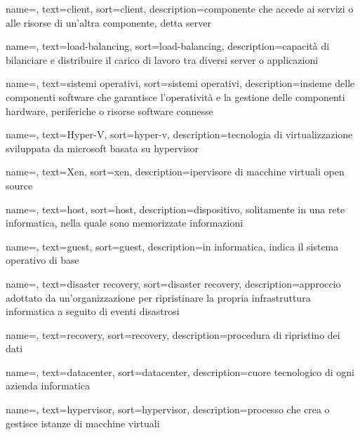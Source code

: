 {
    name=,
    text=client,
    sort=client, 
    description={componente che accede ai servizi o alle risorse di un'altra componente, detta server}
}

{
    name=,
    text=load-balancing,
    sort=load-balancing, 
    description={capacità di bilanciare e distribuire il carico di lavoro tra diversi server o applicazioni}
}

{
    name=,
    text=sistemi operativi,
    sort=sistemi operativi, 
    description={insieme delle componenti software che garantisce l'operatività e la gestione delle componenti hardware, periferiche o risorse software connesse}
}

{
    name=,
    text=Hyper-V,
    sort=hyper-v, 
    description={tecnologia di virtualizzazione sviluppata da microsoft basata su hypervisor}
}

{
    name=,
    text=Xen,
    sort=xen, 
    description={ipervisore di macchine virtuali open source}
}

{
    name=,
    text=host,
    sort=host, 
    description={dispositivo, solitamente in una rete informatica, nella quale sono memorizzate informazioni}
}

{
    name=,
    text=guest,
    sort=guest, 
    description={in informatica, indica il sistema operativo di base}
}

{
    name=,
    text=disaster recovery,
    sort=disaster recovery, 
    description={approccio adottato da un'organizzazione per ripristinare la propria infrastruttura informatica a seguito di eventi disastrosi}
}

{
    name=,
    text=recovery,
    sort=recovery, 
    description={procedura di ripristino dei dati}
}

{
    name=,
    text=datacenter,
    sort=datacenter, 
    description={cuore tecnologico di ogni azienda informatica}
}

{
    name=,
    text=hypervisor,
    sort=hypervisor, 
    description={processo che crea o gestisce istanze di macchine virtuali}
}

